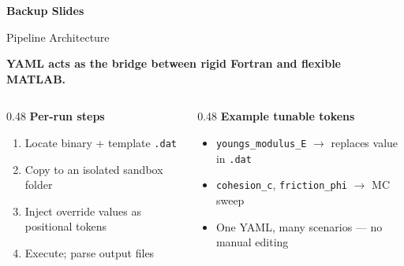 \documentclass[aspectratio=169]{beamer}
\begin{document}
\appendix

\begin{frame}
    \centering
    \vspace{3cm}
    {\Large\textbf{Backup Slides}}
\end{frame}


\begin{frame}[shrink=8]{Pipeline Architecture}
    \centering

    \vspace{0.5cm}
    \raggedright
    \textbf{YAML acts as the bridge between rigid Fortran and flexible MATLAB.}

    \vspace{0.3cm}
    \begin{columns}[t]
        \begin{column}{0.48\textwidth}
            \textbf{Per-run steps}
            \begin{enumerate}
                \setlength\itemsep{0.3em}
                \item Locate binary + template \texttt{.dat}
                \item Copy to an isolated sandbox folder
                \item Inject override values as positional tokens
                \item Execute; parse output files
            \end{enumerate}
        \end{column}
        \begin{column}{0.48\textwidth}
            \textbf{Example tunable tokens}
            \begin{itemize}
                \setlength\itemsep{0.3em}
                \item \texttt{youngs\_modulus\_E} $\to$ replaces value in \texttt{.dat}
                \item \texttt{cohesion\_c}, \texttt{friction\_phi} $\to$ MC sweep
                \item One YAML, many scenarios --- no manual editing
            \end{itemize}
        \end{column}
    \end{columns}
\end{frame}
\end{document}

